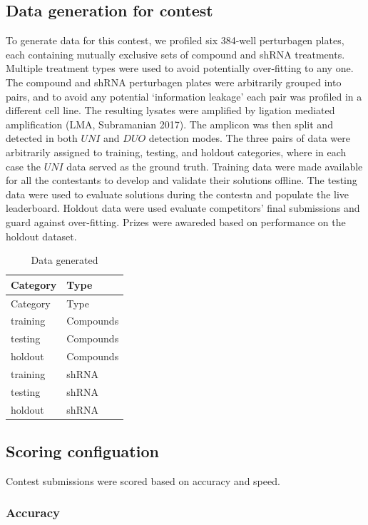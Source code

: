 \documentclass[]{article}
\begin{document}
\hypertarget{data-generation-for-contest}{%
\subsection{Data generation for
contest}\label{data-generation-for-contest}}

To generate data for this contest, we profiled six 384-well perturbagen
plates, each containing mutually exclusive sets of compound and shRNA
treatments. Multiple treatment types were used to avoid potentially
over-fitting to any one. The compound and shRNA perturbagen plates were
arbitrarily grouped into pairs, and to avoid any potential `information
leakage' each pair was profiled in a different cell line. The resulting
lysates were amplified by ligation mediated amplification (LMA,
Subramanian 2017). The amplicon was then split and detected in both
\(UNI\) and \(DUO\) detection modes. The three pairs of data were
arbitrarily assigned to training, testing, and holdout categories, where
in each case the \(UNI\) data served as the ground truth. Training data
were made available for all the contestants to develop and validate
their solutions offline. The testing data were used to evaluate
solutions during the contestn and populate the live leaderboard. Holdout
data were used evaluate competitors' final submissions and guard against
over-fitting. Prizes were awareded based on performance on the holdout
dataset.

\begin{longtable}[]{@{}ll@{}}
\caption{Data generated}\tabularnewline
\toprule
Category & Type\tabularnewline
\midrule
\endfirsthead
\toprule
Category & Type\tabularnewline
\midrule
\endhead
training & Compounds\tabularnewline
testing & Compounds\tabularnewline
holdout & Compounds\tabularnewline
training & shRNA\tabularnewline
testing & shRNA\tabularnewline
holdout & shRNA\tabularnewline
\bottomrule
\end{longtable}

\hypertarget{scoring-configuation}{%
\subsection{Scoring configuation}\label{scoring-configuation}}

Contest submissions were scored based on accuracy and speed.

\hypertarget{accuracy}{%
\subsubsection{Accuracy}\label{accuracy}}
\end{document}

